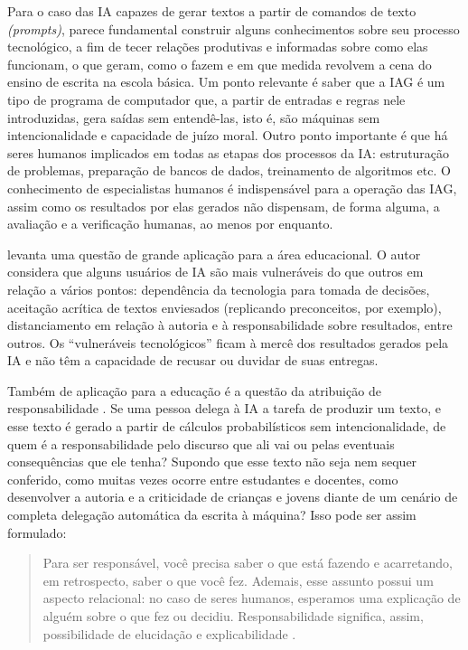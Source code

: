 \documentclass[portuguese]{textolivre}
\begin{document}
Para o caso das IA capazes de gerar textos a partir de comandos de texto \textit{(prompts)}, parece fundamental construir alguns conhecimentos sobre seu processo tecnológico, a fim de tecer relações produtivas e informadas sobre como elas funcionam, o que geram, como o fazem e em que medida revolvem a cena do ensino de escrita na escola básica. Um ponto relevante é saber que a IAG é um tipo de programa de computador que, a partir de entradas e regras nele introduzidas, gera saídas sem entendê-las, isto é, são máquinas sem intencionalidade e capacidade de juízo moral. Outro ponto importante é que há seres humanos implicados em todas as etapas dos processos da IA: estruturação de problemas, preparação de bancos de dados, treinamento de algoritmos etc. O conhecimento de especialistas humanos é indispensável para a operação das IAG, assim como os resultados por elas gerados não dispensam, de forma alguma, a avaliação e a verificação humanas, ao menos por enquanto.

\textcite{coeckelbergh2023} levanta uma questão de grande aplicação para a área educacional. O autor considera que alguns usuários de IA são mais vulneráveis do que outros em relação a vários pontos: dependência da tecnologia para tomada de decisões, aceitação acrítica de textos enviesados (replicando preconceitos, por exemplo), distanciamento em relação à autoria e à responsabilidade sobre resultados, entre outros. Os ``vulneráveis tecnológicos'' ficam à mercê dos resultados gerados pela IA e não têm a capacidade de recusar ou duvidar de suas entregas.

Também de aplicação para a educação é a questão da atribuição de responsabilidade \cite{coeckelbergh2023}. Se uma pessoa delega à IA a tarefa de produzir um texto, e esse texto é gerado a partir de cálculos probabilísticos sem intencionalidade, de quem é a responsabilidade pelo discurso que ali vai ou pelas eventuais consequências que ele tenha? Supondo que esse texto não seja nem sequer conferido, como muitas vezes ocorre entre estudantes e docentes, como desenvolver a autoria e a criticidade de crianças e jovens diante de um cenário de completa delegação automática da escrita à máquina? Isso pode ser assim formulado:

\begin{quote}
    Para ser responsável, você precisa saber o que está fazendo e acarretando, em retrospecto, saber o que você fez. Ademais, esse assunto possui um aspecto relacional: no caso de seres humanos, esperamos uma explicação de alguém sobre o que fez ou decidiu. Responsabilidade significa, assim, possibilidade de elucidação e explicabilidade \cite[p. 108]{coeckelbergh2023}.
\end{quote}
\end{document}
